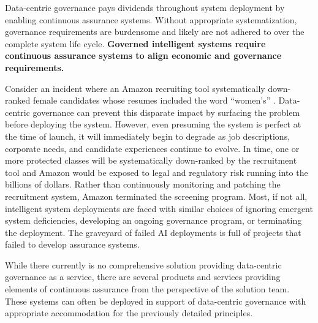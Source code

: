 Data-centric governance pays dividends throughout system deployment by enabling continuous assurance systems. Without appropriate systematization, governance requirements are burdensome and likely are not adhered to over the complete system life cycle. \textbf{Governed intelligent systems require continuous assurance systems to align economic and governance requirements.}

Consider an incident where an Amazon recruiting tool systematically down-ranked female candidates whose resumes included the word ``women's'' \cite{anonymous_incident_2016}. Data-centric governance can prevent this disparate impact by surfacing the problem before deploying the system. However, even presuming the system is perfect at the time of launch, it will immediately begin to degrade as job descriptions, corporate needs, and candidate experiences continue to evolve. In time, one or more protected classes will be systematically down-ranked by the recruitment tool and Amazon would be exposed to legal and regulatory risk running into the billions of dollars. Rather than continuously monitoring and patching the recruitment system, Amazon terminated the screening program. Most, if not all, intelligent system deployments are faced with similar choices of ignoring emergent system deficiencies, developing an ongoing governance program, or terminating the deployment. The graveyard of failed AI deployments is full of projects that failed to develop assurance systems.


While there currently is no comprehensive solution providing data-centric governance as a service, there are several products and services providing elements of continuous assurance from the perspective of the solution team. These systems can often be deployed in support of data-centric governance with appropriate accommodation for the previously detailed principles.

